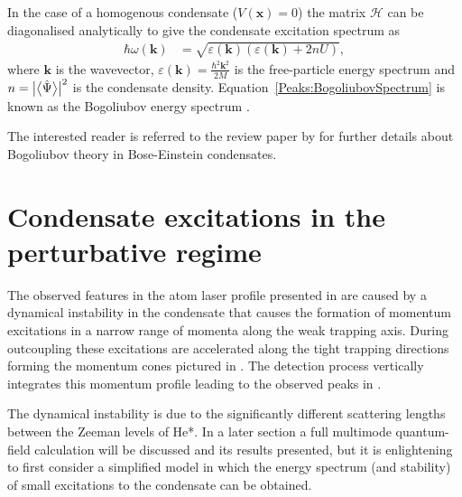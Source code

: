 In the case of a homogenous condensate ($V(\bm{x}) = 0$) the matrix $\mathcal{H}$ can be diagonalised analytically to give the condensate excitation spectrum as
\begin{align}
    \hbar \omega(\bm{k}) &= \sqrt{\varepsilon(\bm{k})\left(\varepsilon(\bm{k}) + 2 n U \right)},
    \label{Peaks:BogoliubovSpectrum}
\end{align}
where $\bm{k}$ is the wavevector, $\displaystyle \varepsilon(\bm{k}) = \frac{\hbar^2 \bm{k}^2}{2 M}$ is the free-particle energy spectrum and $n = \big|{\big<\hat{\Psi}\big>} \big|^2$ is the condensate density. Equation~\eqref{Peaks:BogoliubovSpectrum} is known as the Bogoliubov energy spectrum \citep{Bogoliubov:1947}.

The interested reader is referred to the review paper by \citet{Ozeri:2005} for further details about Bogoliubov theory in Bose-Einstein condensates.

\section{Condensate excitations in the perturbative regime}
\label{Peaks:PerturbativeApproach}

The observed features in the atom laser profile presented in  are caused by a dynamical instability in the condensate that causes the formation of momentum excitations in a narrow range of momenta along the weak trapping axis. During outcoupling these excitations are accelerated along the tight trapping directions forming the momentum cones pictured in . The detection process vertically integrates this momentum profile leading to the observed peaks in .

The dynamical instability is due to the significantly different scattering lengths between the Zeeman levels of He*. In a later section a full multimode quantum-field calculation will be discussed and its results presented, but it is enlightening to first consider a simplified model in which the energy spectrum (and stability) of small excitations to the condensate can be obtained.

